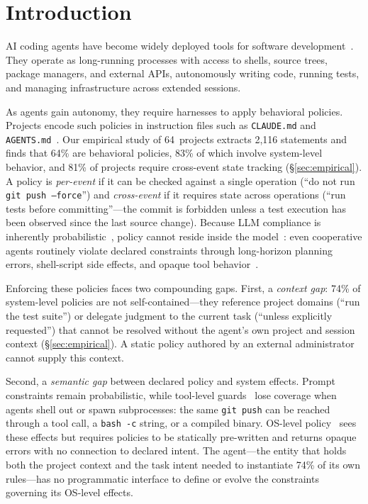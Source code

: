 \section{Introduction}


AI coding agents have become widely deployed tools for software
development~\cite{agentsight}. They operate as long-running processes with
access to shells, source trees, package managers, and external APIs,
autonomously writing code, running tests, and managing infrastructure across
extended sessions.

As agents gain autonomy, they require harnesses to apply behavioral
policies. Projects encode such policies in instruction files such
as \texttt{CLAUDE.md} and
\texttt{AGENTS.md}~\cite{chatlatanagulchai2025manifests,lulla2026agentsmd}.
Our empirical study of 64~projects extracts 2{,}116 statements and finds
that 64\% are behavioral policies, 83\% of which involve system-level
behavior, and 81\% of projects require cross-event state tracking
(\S\ref{sec:empirical}).
A policy is \emph{per-event} if it can be checked against a single
operation (``do not run \texttt{git push --force}'') and
\emph{cross-event} if it requires state across operations (``run tests
before committing''---the commit is forbidden unless a test execution
has been observed since the last source change).
Because LLM compliance is inherently
probabilistic~\cite{liu2024lost}, policy cannot reside inside the
model~\cite{langchain-harness,fowler-harness}: even cooperative agents
routinely violate declared constraints through long-horizon planning
errors, shell-script side effects, and opaque tool
behavior~\cite{jimenez2024swebench}.

Enforcing these policies faces two compounding gaps. First, a
\emph{context gap}: 74\% of system-level policies are not
self-contained---they reference project domains (``run the test suite'')
or delegate judgment to the current task (``unless explicitly
requested'') that cannot be resolved without the agent's own project
and session context (\S\ref{sec:empirical}). A static policy authored
by an external administrator cannot supply this context.

Second, a \emph{semantic gap} between declared policy and system effects.
Prompt constraints remain probabilistic, while tool-level
guards~\cite{wang2025agentspec,shi2025progent} lose coverage when agents
shell out or spawn subprocesses: the same \texttt{git~push} can be reached
through a tool call, a \texttt{bash~-c} string, or a compiled binary.
OS-level policy~\cite{ciliumtetragon,flume,pasquier2018camquery} sees
these effects but requires policies to be statically pre-written and
returns opaque errors with no connection to declared intent.
The agent---the entity that holds both the project context and the
task intent needed to instantiate 74\% of its own rules---has no
programmatic interface to define or evolve the constraints governing
its OS-level effects.

